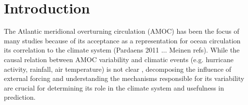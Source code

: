 \documentclass[a4paper,11pt]{article}
\begin{document}
\begin{abstract}

\end{abstract}

\section{Introduction} 
\label{intro}
	
	The Atlantic meridional overturning circulation (AMOC) has been the focus of many studies because of its acceptance as a representation for ocean circulation its correlation to the climate system (Pardaens 2011 ... Meinen refs). While the causal relation between AMOC variability and climatic events (e.g. hurricane activity, rainfall, air temperature) is not clear \cite{wunschAmoc}, decomposing the influence of external forcing and understanding the mechanisms responsible for its variability are crucial for determining its role in the climate system and usefulness in prediction.  
\end{document}
